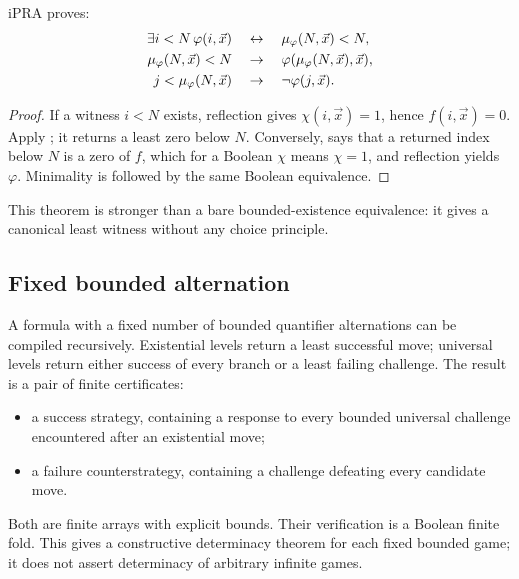 \begin{theorem}
iPRA proves:
\[
\begin{aligned}
 \exists i<N\,\varphi(i,\vec x)
   &\quad\leftrightarrow\quad \mu_\varphi(N,\vec x)<N,\\
 \mu_\varphi(N,\vec x)<N
   &\quad\rightarrow\quad
     \varphi(\mu_\varphi(N,\vec x),\vec x),\\
 j<\mu_\varphi(N,\vec x)
   &\quad\rightarrow\quad
     \neg\varphi(j,\vec x).
\end{aligned}
\]
\end{theorem}

\begin{proof}
If a witness \(i<N\) exists, reflection gives \(\chi(i,\vec x)=1\), hence
\(f(i,\vec x)=0\).  Apply ; it returns a least zero below
\(N\).  Conversely,  says that a returned index below \(N\)
is a zero of \(f\), which for a Boolean \(\chi\) means
\(\chi=1\), and reflection yields \(\varphi\).  Minimality is
 followed by the same Boolean equivalence.
\end{proof}

This theorem is stronger than a bare bounded-existence equivalence: it gives a
canonical least witness without any choice principle.

\subsection{Fixed bounded alternation}

A formula with a fixed number of bounded quantifier alternations can be
compiled recursively.  Existential levels return a least successful move;
universal levels return either success of every branch or a least failing
challenge.  The result is a pair of finite certificates:

\begin{itemize}
\item a success strategy, containing a response to every bounded universal
challenge encountered after an existential move;
\item a failure counterstrategy, containing a challenge defeating every
candidate move.
\end{itemize}

Both are finite arrays with explicit bounds.  Their verification is a Boolean
finite fold.  This gives a constructive determinacy theorem for each fixed
bounded game; it does not assert determinacy of arbitrary infinite games.

